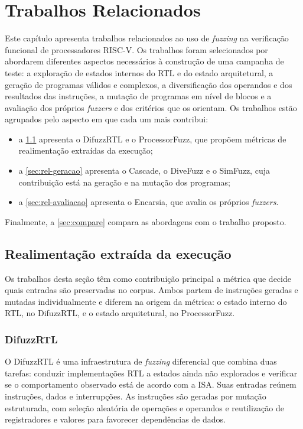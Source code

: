 \chapter{\label{chap:related}Trabalhos Relacionados}

Este capítulo apresenta trabalhos relacionados ao uso de \textit{fuzzing} na verificação funcional de processadores RISC-V. Os trabalhos foram selecionados por abordarem diferentes aspectos necessários à construção de uma campanha de teste: a exploração de estados internos do RTL e do estado arquitetural, a geração de programas válidos e complexos, a diversificação dos operandos e dos resultados das instruções, a mutação de programas em nível de blocos e a avaliação dos próprios \textit{fuzzers} e dos critérios que os orientam. 
Os trabalhos estão agrupados pelo aspecto em que cada um mais contribui:
\begin{itemize}
    \item a \cref{sec:rel-feedback} apresenta o DifuzzRTL e o ProcessorFuzz, que propõem métricas de realimentação extraídas da execução;
    \item a \cref{sec:rel-geracao} apresenta o Cascade, o DiveFuzz e o SimFuzz, cuja contribuição está na geração e na mutação dos programas;
    \item a \cref{sec:rel-avaliacao} apresenta o Encarsia, que avalia os próprios \textit{fuzzers}.
\end{itemize}

Finalmente, a \cref{sec:compare} compara as abordagens com o trabalho proposto.

\section{Realimentação extraída da execução}\label{sec:rel-feedback}

Os trabalhos desta seção têm como contribuição principal a métrica que decide quais entradas são preservadas no corpus. Ambos partem de instruções geradas e mutadas individualmente e diferem na origem da métrica: o estado interno do RTL, no DifuzzRTL, e o estado arquitetural, no ProcessorFuzz.

\subsection{DifuzzRTL}\label{sec:difuzz}

O DifuzzRTL \citep{Hur:2021:DifuzzRTL} é uma infraestrutura de \textit{fuzzing} diferencial que combina duas tarefas: conduzir implementações RTL a estados ainda não explorados e verificar se o comportamento observado está de acordo com a ISA. Suas entradas reúnem instruções, dados e interrupções. As instruções são geradas por mutação estruturada, com seleção aleatória de operações e operandos e reutilização de registradores e valores para favorecer dependências de dados.

